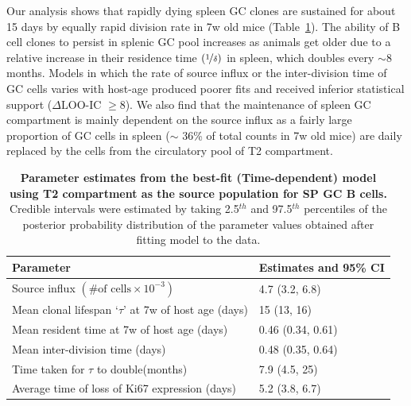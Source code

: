 \documentclass[11pt,onecolumn]{article}
\newcommand{\looic}{\ensuremath{\Delta \text{LOO-IC}}}
\begin{document}
	Our analysis shows that rapidly dying spleen GC clones are sustained for about 15 days by equally rapid division rate in 7w old mice (Table~\ref{tab:SPGC-parestm}).
	The ability of B cell clones to persist in splenic GC pool increases as animals get older due to a relative increase in their residence time $(\nicefrac{1}{\delta})$ in spleen, which doubles every $\sim$8 months.
	Models in which the rate of source influx or the inter-division time of GC cells varies with host-age produced poorer fits and received inferior statistical support  ({\looic} $\ge 8$).  
	We also find that the maintenance of spleen GC compartment is mainly dependent on the source influx as a fairly large proportion of GC cells in spleen ($\sim$ 36\% of total counts in 7w old mice) are daily replaced by the cells from the circulatory pool of T2 compartment. 
	
\begin{table}[h!]
\begin{center}
		\renewcommand{\arraystretch}{1.25}
		\begin{tabular}{l l }
			\toprule
			\textbf{Parameter}                                & \textbf{Estimates and 95\% CI} \\
			\toprule
			Source influx $(\# \text{of cells} \times 10^{-3})$      & 4.7 (3.2, 6.8)       \\
			Mean clonal lifespan `$\tau$' at 7w of host age (days)   & 15 (13, 16)           \\
			Mean resident time at 7w of host age  (days)             & 0.46 (0.34, 0.61)     \\			
			Mean inter-division time (days)                          & 0.48 (0.35, 0.64)     \\
			Time taken for $\tau$ to double(months)                  & 7.9 (4.5, 25)        \\
			Average time of loss of Ki67 expression (days)           & 5.2 (3.8, 6.7)  \\					
			\hline
			\toprule 
		\end{tabular}
	\end{center}
	\caption{\small \textbf{Parameter estimates from the best-fit (Time-dependent) model using T2 compartment as the source population for SP GC B cells.}  Credible intervals were estimated by taking 2.5$^{th}$ and 97.5$^{th}$ percentiles of the posterior probability distribution of the parameter values obtained after fitting model to the data.}
	\label{tab:SPGC-parestm}
\end{table} 
	
\end{document}
